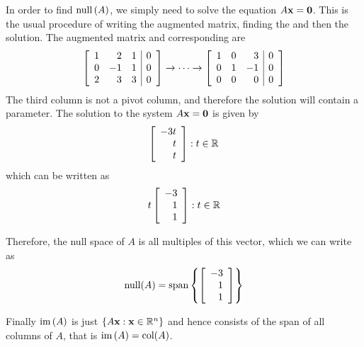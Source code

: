 \begin{solution}
In order to find $\mbox{null} \left( A\right) $, we simply need to solve the
equation $A{\bf x}={\bf 0}$. This is the usual procedure of writing
the augmented matrix, finding the {\rref} and then the solution. The
augmented matrix and corresponding {\rref} are
\begin{equation*}
\left[ 
\begin{array}{rrr|r}
1 & 2 & 1 & 0 \\ 
0 & -1 & 1 & 0 \\ 
2 & 3 & 3 & 0
\end{array}
\right]
\rightarrow \cdots \rightarrow
\left[ 
\begin{array}{rrr|r}
1 & 0 & 3 & 0 \\ 
0 & 1 & -1 & 0 \\ 
0 & 0 & 0 & 0
\end{array}
\right]
\end{equation*}
The third column is not a pivot column, and therefore the solution
will contain a parameter. The solution to the system
$A{\bf x}={\bf 0}$ is given by
\begin{equation*}
\left[ 
\begin{array}{r}
-3t \\ 
t \\ 
t
\end{array}
\right] :t\in \mathbb{R}
\end{equation*}
which can be written as 
\begin{equation*}
t
\left[ 
\begin{array}{r}
-3 \\ 
1 \\ 
1
\end{array}
\right] :t\in \mathbb{R}
\end{equation*}

Therefore, the null space of $A$ is all multiples of this vector, which we can write as
\begin{equation*}
\mbox{null} (A) = \mbox{span} \left\{ \left[ 
\begin{array}{r}
-3 \\ 
1 \\ 
1
\end{array}
\right]
\right\}
\end{equation*}

Finally $\mbox{im}\left( A\right) $ is just $\left\{ A{\bf x} :
{\bf x} \in \mathbb{R}^n \right\}$ and hence consists of the span of
all columns of $A$, that is $\mbox{im}\left( A\right) = \mbox{col} (A)$. 


\end{solution}
